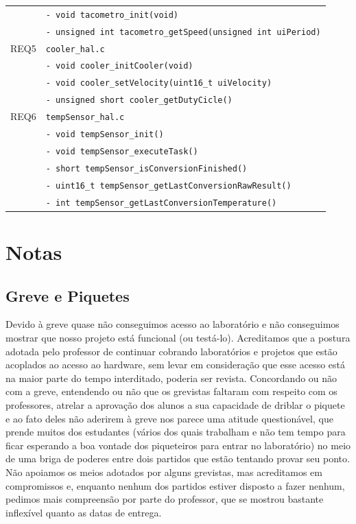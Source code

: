 \documentclass{article}
\begin{document}
\begin{table}[H]
{\begin{tabular}{|c|l|}
						& \texttt{- void tacometro\_init(void)}\\ 
						& \texttt{- unsigned int tacometro\_getSpeed(unsigned int uiPeriod)}\\
		\hline REQ5
						& \texttt{cooler\_hal.c}\\
						& \texttt{- void cooler\_initCooler(void)}\\
						& \texttt{- void cooler\_setVelocity(uint16\_t uiVelocity)}\\
						& \texttt{- unsigned short cooler\_getDutyCicle()}\\				
		\hline REQ6
						& \texttt{tempSensor\_hal.c}\\
						& \texttt{- void tempSensor\_init()}\\
						& \texttt{- void tempSensor\_executeTask()}\\
						& \texttt{- short tempSensor\_isConversionFinished()}\\
						& \texttt{- uint16\_t tempSensor\_getLastConversionRawResult()}\\
						& \texttt{- int tempSensor\_getLastConversionTemperature()}\\
		\hline 
	\end{tabular}
	} 
	\normalsize
\end{table}
\section{Notas}
\subsection{Greve e Piquetes}
Devido à greve quase não conseguimos acesso ao laboratório e não conseguimos mostrar que nosso projeto está funcional (ou testá-lo). Acreditamos que a postura adotada pelo professor de continuar cobrando laboratórios e projetos que estão acoplados ao acesso ao hardware, sem levar em consideração que esse acesso está na maior parte do tempo interditado, poderia ser revista. Concordando ou não com a greve, entendendo ou não que os grevistas faltaram com respeito com os professores, atrelar a aprovação dos alunos a sua capacidade de driblar o piquete e ao fato deles não aderirem à greve nos parece uma atitude questionável, que prende muitos dos estudantes (vários dos quais trabalham e não tem tempo para ficar esperando a boa vontade dos piqueteiros para entrar no laboratório) no meio de uma briga de poderes entre dois partidos que estão tentando provar seu ponto. Não apoiamos os meios adotados por alguns grevistas, mas acreditamos em compromissos e, enquanto nenhum dos partidos estiver disposto a fazer nenhum, pedimos mais compreensão por parte do professor, que se mostrou bastante inflexível quanto as datas de entrega.
\end{document}
